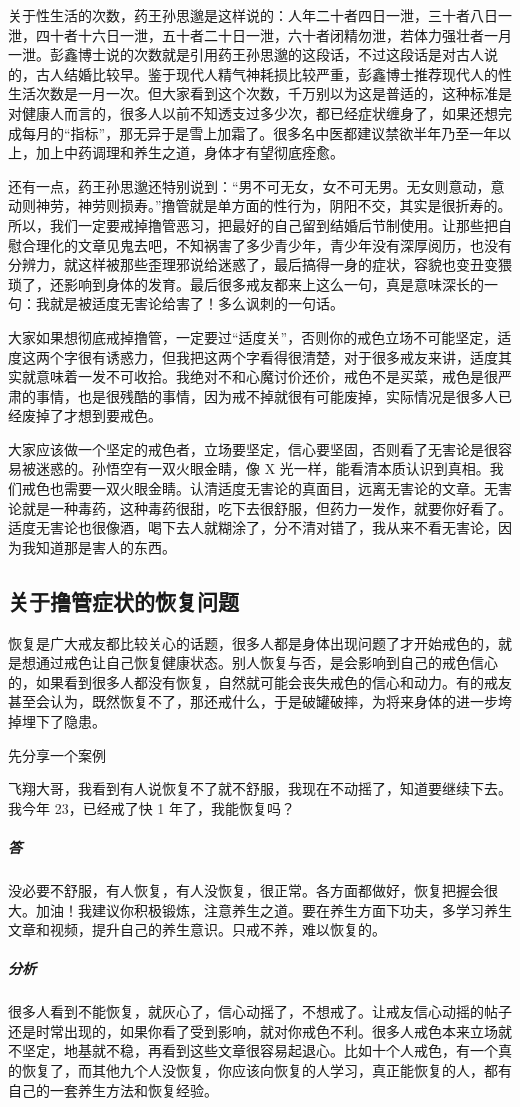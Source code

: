 关于性生活的次数，药王孙思邈是这样说的：人年二十者四日一泄，三十者八日一泄，四十者十六日一泄，五十者二十日一泄，六十者闭精勿泄，若体力强壮者一月一泄。彭鑫博士说的次数就是引用药王孙思邈的这段话，不过这段话是对古人说的，古人结婚比较早。鉴于现代人精气神耗损比较严重，彭鑫博士推荐现代人的性生活次数是一月一次。但大家看到这个次数，千万别以为这是普适的，这种标准是对健康人而言的，很多人以前不知透支过多少次，都已经症状缠身了，如果还想完成每月的“指标”，那无异于是雪上加霜了。很多名中医都建议禁欲半年乃至一年以上，加上中药调理和养生之道，身体才有望彻底痊愈。

还有一点，药王孙思邈还特别说到：“男不可无女，女不可无男。无女则意动，意动则神劳，神劳则损寿。”撸管就是单方面的性行为，阴阳不交，其实是很折寿的。所以，我们一定要戒掉撸管恶习，把最好的自己留到结婚后节制使用。让那些把自慰合理化的文章见鬼去吧，不知祸害了多少青少年，青少年没有深厚阅历，也没有分辨力，就这样被那些歪理邪说给迷惑了，最后搞得一身的症状，容貌也变丑变猥琐了，还影响到身体的发育。最后很多戒友都来上这么一句，真是意味深长的一句：我就是被适度无害论给害了！多么讽刺的一句话。

大家如果想彻底戒掉撸管，一定要过“适度关”，否则你的戒色立场不可能坚定，适度这两个字很有诱惑力，但我把这两个字看得很清楚，对于很多戒友来讲，适度其实就意味着一发不可收拾。我绝对不和心魔讨价还价，戒色不是买菜，戒色是很严肃的事情，也是很残酷的事情，因为戒不掉就很有可能废掉，实际情况是很多人已经废掉了才想到要戒色。

大家应该做一个坚定的戒色者，立场要坚定，信心要坚固，否则看了无害论是很容易被迷惑的。孙悟空有一双火眼金睛，像 X 光一样，能看清本质认识到真相。我们戒色也需要一双火眼金睛。认清适度无害论的真面目，远离无害论的文章。无害论就是一种毒药，这种毒药很甜，吃下去很舒服，但药力一发作，就要你好看了。适度无害论也很像酒，喝下去人就糊涂了，分不清对错了，我从来不看无害论，因为我知道那是害人的东西。

\subsection{关于撸管症状的恢复问题}

恢复是广大戒友都比较关心的话题，很多人都是身体出现问题了才开始戒色的，就是想通过戒色让自己恢复健康状态。别人恢复与否，是会影响到自己的戒色信心的，如果看到很多人都没有恢复，自然就可能会丧失戒色的信心和动力。有的戒友甚至会认为，既然恢复不了，那还戒什么，于是破罐破摔，为将来身体的进一步垮掉埋下了隐患。

先分享一个案例

\begin{case}
    飞翔大哥，我看到有人说恢复不了就不舒服，我现在不动摇了，知道要继续下去。我今年 23，已经戒了快 1 年了，我能恢复吗？
    \subparagraph{答} 没必要不舒服，有人恢复，有人没恢复，很正常。各方面都做好，恢复把握会很大。加油！我建议你积极锻炼，注意养生之道。要在养生方面下功夫，多学习养生文章和视频，提升自己的养生意识。只戒不养，难以恢复的。
    \subparagraph{分析} 很多人看到不能恢复，就灰心了，信心动摇了，不想戒了。让戒友信心动摇的帖子还是时常出现的，如果你看了受到影响，就对你戒色不利。很多人戒色本来立场就不坚定，地基就不稳，再看到这些文章很容易起退心。比如十个人戒色，有一个真的恢复了，而其他九个人没恢复，你应该向恢复的人学习，真正能恢复的人，都有自己的一套养生方法和恢复经验。
\end{case}

